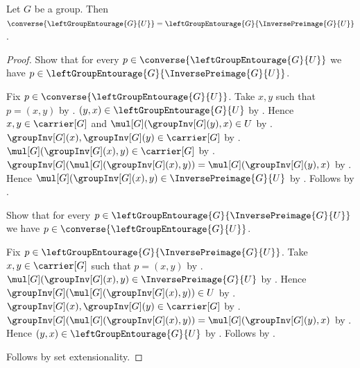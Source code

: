 \begin{proposition}\label{left_group_entourage_converse}
    Let $G$ be a group.
    Then $\converse{\leftGroupEntourage{G}{U}}
        =\leftGroupEntourage{G}{\InversePreimage{G}{U}}$.
\end{proposition}
\begin{proof}
    Show that for every
        $p\in\converse{\leftGroupEntourage{G}{U}}$ we have
        $p\in\leftGroupEntourage{G}{\InversePreimage{G}{U}}$.
    \begin{subproof}
        Fix $p\in\converse{\leftGroupEntourage{G}{U}}$.
        Take $x,y$ such that $p=(x,y)$
            by .
        $(y,x)\in\leftGroupEntourage{G}{U}$
            by .
        Hence $x,y\in\carrier[G]$ and
            $\mul[G](\groupInv[G](y),x)\in U$
            by .
        $\groupInv[G](x),\groupInv[G](y)\in\carrier[G]$
            by .
        $\mul[G](\groupInv[G](x),y)\in\carrier[G]$
            by .
        $\groupInv[G](\mul[G](\groupInv[G](x),y))
            =\mul[G](\groupInv[G](y),x)$
            by .
        Hence $\mul[G](\groupInv[G](x),y)
            \in\InversePreimage{G}{U}$ by .
        Follows by .
    \end{subproof}
    Show that for every
        $p\in\leftGroupEntourage{G}{\InversePreimage{G}{U}}$ we have
        $p\in\converse{\leftGroupEntourage{G}{U}}$.
    \begin{subproof}
        Fix $p\in\leftGroupEntourage{G}{\InversePreimage{G}{U}}$.
        Take $x,y\in\carrier[G]$ such that $p=(x,y)$
            by .
        $\mul[G](\groupInv[G](x),y)
            \in\InversePreimage{G}{U}$
            by .
        Hence
            $\groupInv[G](\mul[G](\groupInv[G](x),y))\in U$
            by .
        $\groupInv[G](x),\groupInv[G](y)\in\carrier[G]$
            by .
        $\groupInv[G](\mul[G](\groupInv[G](x),y))
            =\mul[G](\groupInv[G](y),x)$
            by .
        Hence $(y,x)\in\leftGroupEntourage{G}{U}$
            by .
        Follows by .
    \end{subproof}
    Follows by set extensionality.
\end{proof}

